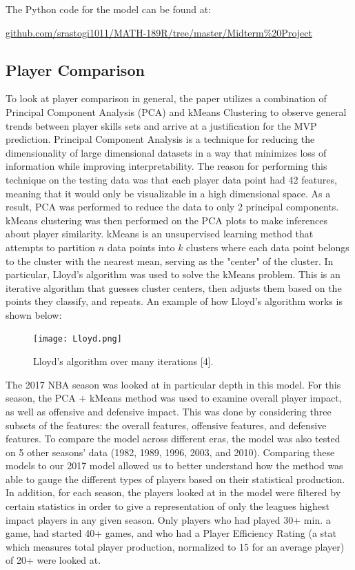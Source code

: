 \documentclass{article}
\begin{document}
The Python code for the model can be found at:
\begin{center}
	\url{github.com/srastogi1011/MATH-189R/tree/master/Midterm\%20Project}
\end{center}

\subsection{Player Comparison}

To look at player comparison in general, the paper utilizes a combination of Principal Component Analysis (PCA) and kMeans Clustering to observe general trends between player skills sets and arrive at a justification for the MVP prediction. Principal Component Analysis is a technique for reducing the dimensionality of large dimensional datasets in a way that minimizes loss of information while improving interpretability. The reason for performing this technique on the testing data was that each player data point had 42 features, meaning that it would only be visualizable in a high dimensional space. As a result, PCA was performed to reduce the data to only 2 principal components. kMeans clustering was then performed on the PCA plots to make inferences about player similarity. kMeans is an unsupervised learning method that attempts to partition $n$ data points into $k$ clusters where each data point belongs to the cluster with the nearest mean, serving as the "center" of the cluster. In particular, Lloyd's algorithm was used to solve the kMeans problem. This is an iterative algorithm that guesses cluster centers, then adjusts them based on the points they classify, and repeats. An example of how Lloyd's algorithm works is shown below:

\begin{figure} [h]
  \centering
  \texttt{[image: Lloyd.png]}
  \caption{Lloyd's algorithm over many iterations [4].}
\end{figure}

The 2017 NBA season was looked at in particular depth in this model. For this season, the PCA + kMeans method was used to examine overall player impact, as well as offensive and defensive impact. This was done by considering three subsets of the features: the overall features, offensive features, and defensive features. To compare the model across different eras, the model was also tested on 5 other seasons' data (1982, 1989, 1996, 2003, and 2010). Comparing these models to our 2017 model allowed us to better understand how the method was able to gauge the different types of players based on their statistical production. In addition, for each season, the players looked at in the model were filtered by certain statistics in order to give a representation of only the leagues highest impact players in any given season. Only players who had played 30+ min. a game, had started 40+ games, and who had a Player Efficiency Rating (a stat which measures total player production, normalized to 15 for an average player) of 20+ were looked at.
\end{document}
